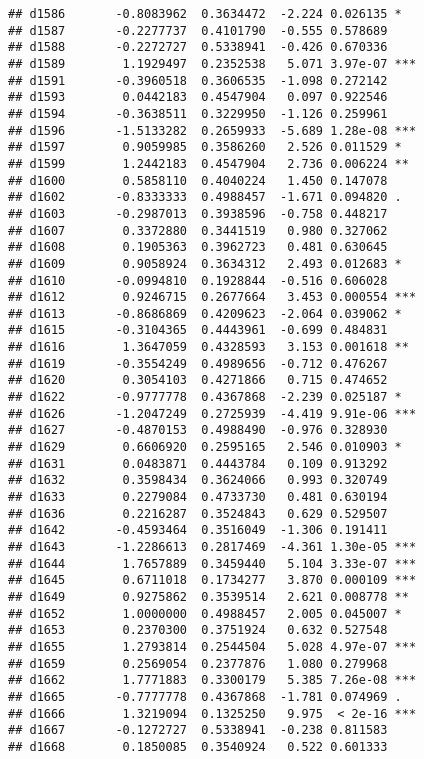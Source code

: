 \documentclass[
]{article}
\begin{document}
\begin{verbatim}
## d1586       -0.8083962  0.3634472  -2.224 0.026135 *  
## d1587       -0.2277737  0.4101790  -0.555 0.578689    
## d1588       -0.2272727  0.5338941  -0.426 0.670336    
## d1589        1.1929497  0.2352538   5.071 3.97e-07 ***
## d1591       -0.3960518  0.3606535  -1.098 0.272142    
## d1593        0.0442183  0.4547904   0.097 0.922546    
## d1594       -0.3638511  0.3229950  -1.126 0.259961    
## d1596       -1.5133282  0.2659933  -5.689 1.28e-08 ***
## d1597        0.9059985  0.3586260   2.526 0.011529 *  
## d1599        1.2442183  0.4547904   2.736 0.006224 ** 
## d1600        0.5858110  0.4040224   1.450 0.147078    
## d1602       -0.8333333  0.4988457  -1.671 0.094820 .  
## d1603       -0.2987013  0.3938596  -0.758 0.448217    
## d1607        0.3372880  0.3441519   0.980 0.327062    
## d1608        0.1905363  0.3962723   0.481 0.630645    
## d1609        0.9058924  0.3634312   2.493 0.012683 *  
## d1610       -0.0994810  0.1928844  -0.516 0.606028    
## d1612        0.9246715  0.2677664   3.453 0.000554 ***
## d1613       -0.8686869  0.4209623  -2.064 0.039062 *  
## d1615       -0.3104365  0.4443961  -0.699 0.484831    
## d1616        1.3647059  0.4328593   3.153 0.001618 ** 
## d1619       -0.3554249  0.4989656  -0.712 0.476267    
## d1620        0.3054103  0.4271866   0.715 0.474652    
## d1622       -0.9777778  0.4367868  -2.239 0.025187 *  
## d1626       -1.2047249  0.2725939  -4.419 9.91e-06 ***
## d1627       -0.4870153  0.4988490  -0.976 0.328930    
## d1629        0.6606920  0.2595165   2.546 0.010903 *  
## d1631        0.0483871  0.4443784   0.109 0.913292    
## d1632        0.3598434  0.3624066   0.993 0.320749    
## d1633        0.2279084  0.4733730   0.481 0.630194    
## d1636        0.2216287  0.3524843   0.629 0.529507    
## d1642       -0.4593464  0.3516049  -1.306 0.191411    
## d1643       -1.2286613  0.2817469  -4.361 1.30e-05 ***
## d1644        1.7657889  0.3459440   5.104 3.33e-07 ***
## d1645        0.6711018  0.1734277   3.870 0.000109 ***
## d1649        0.9275862  0.3539514   2.621 0.008778 ** 
## d1652        1.0000000  0.4988457   2.005 0.045007 *  
## d1653        0.2370300  0.3751924   0.632 0.527548    
## d1655        1.2793814  0.2544504   5.028 4.97e-07 ***
## d1659        0.2569054  0.2377876   1.080 0.279968    
## d1662        1.7771883  0.3300179   5.385 7.26e-08 ***
## d1665       -0.7777778  0.4367868  -1.781 0.074969 .  
## d1666        1.3219094  0.1325250   9.975  < 2e-16 ***
## d1667       -0.1272727  0.5338941  -0.238 0.811583    
## d1668        0.1850085  0.3540924   0.522 0.601333    

\end{verbatim}
\end{document}
